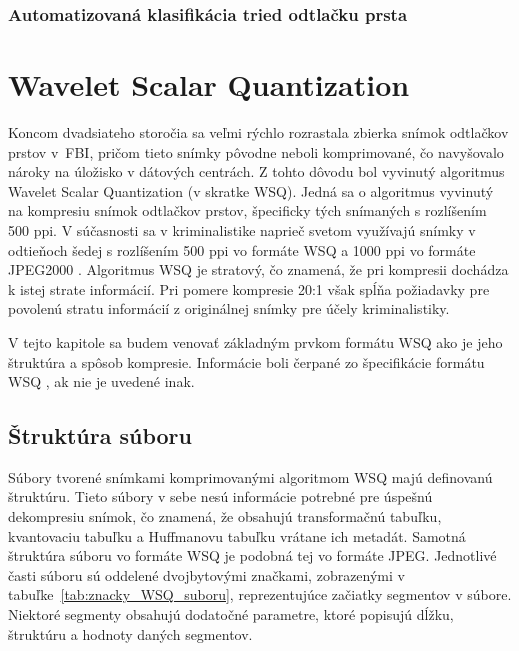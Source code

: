   \subsection{Automatizovaná klasifikácia tried odtlačku prsta} \label{sec:auto_klasif}

\chapter{Wavelet Scalar Quantization} \label{kap:wsq}
  Koncom dvadsiateho storočia sa veľmi rýchlo rozrastala zbierka snímok odtlačkov prstov v~FBI, pričom tieto snímky pôvodne neboli komprimované,
  čo navyšovalo nároky na úložisko v dátových centrách. Z tohto dôvodu bol vyvinutý algoritmus Wavelet Scalar Quantization (v skratke WSQ).
  Jedná sa o algoritmus vyvinutý na kompresiu snímok odtlačkov prstov, špecificky tých snímaných s rozlíšením 500 ppi. V súčasnosti sa v kriminalistike
  naprieč svetom využívajú snímky v odtieňoch šedej s rozlíšením 500 ppi vo formáte WSQ a 1000 ppi vo formáte JPEG2000 \cite{Libert}.
  Algoritmus WSQ je stratový, čo znamená, že pri kompresii dochádza k istej strate informácií. Pri pomere kompresie 20:1 však spĺňa požiadavky
  pre povolenú stratu informácií z originálnej snímky pre účely kriminalistiky. 
  
  V tejto kapitole sa budem venovať základným prvkom formátu WSQ ako je jeho štruktúra a spôsob kompresie. Informácie boli čerpané zo špecifikácie
  formátu WSQ \cite{WSQSpecification}, ak nie je uvedené inak.

  \section{Štruktúra súboru} \label{sec:struktura}
  Súbory tvorené snímkami komprimovanými algoritmom WSQ majú definovanú štruktúru. Tieto súbory v sebe nesú informácie potrebné pre úspešnú
  dekompresiu snímok, čo znamená, že obsahujú transformačnú tabuľku, kvantovaciu tabuľku a Huffmanovu tabuľku vrátane ich metadát.
  Samotná štruktúra súboru vo formáte WSQ je podobná tej vo formáte JPEG. Jednotlivé časti súboru sú oddelené dvojbytovými značkami,
  zobrazenými v tabuľke~\ref{tab:znacky_WSQ_suboru}, reprezentujúce začiatky segmentov v súbore. Niektoré segmenty obsahujú dodatočné parametre,
  ktoré popisujú dĺžku, štruktúru a hodnoty daných segmentov.

